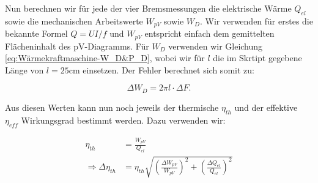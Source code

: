 \documentclass{article}
\begin{document}
\begin{table}[!h]
    \centering
    \caption{Messergebnisse der Bremsmessung - gemittelt}
    \label{tab:Bremsmessung-Mittel}
\end{table}

\phantom{.}

Nun berechnen wir für jede der vier Bremsmessungen die elektrische Wärme $Q_{el}$ sowie die mechanischen Arbeitswerte $W_{pV}$ sowie $W_D$. Wir verwenden für erstes die bekannte Formel $Q = UI/f$ und $W_{pV}$ entspricht einfach dem gemittelten Flächeninhalt des pV-Diagramms. Für $W_D$ verwenden wir Gleichung \ref{eq:Wärmekraftmaschine-W_D&P_D}, wobei wir für $l$ die im Skrtipt gegebene Länge von $l= 25$cm einsetzen. Der Fehler berechnet sich somit zu:

\begin{equation}
    \Delta W_D = 2 \pi l \cdot \Delta F.
\end{equation}

Aus diesen Werten kann nun noch jeweils der thermische $\eta_{th}$ und der effektive $\eta_{eff}$ Wirkungsgrad bestimmt werden. Dazu verwenden wir:


\begin{equation}
    \begin{split}
        \eta_{th} &= \frac{W_{pV}}{Q_{el}} \\
        \Rightarrow \Delta \eta_{th} &= \eta_{th} \sqrt{\left( \frac{\Delta W_{pV}}{W_{pV}} \right)^2 + \left( \frac{\Delta Q_{el}}{Q_{el}} \right)^2}
    \end{split}
\end{equation}
\end{document}
